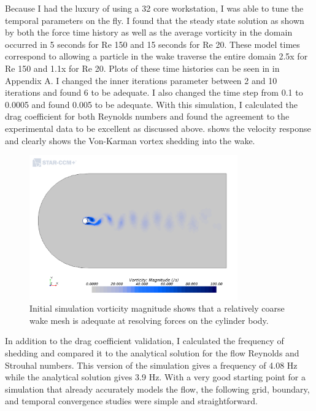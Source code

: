 \documentclass[10pt,english]{article}
\begin{document}
 Because I had the luxury of using a 32 core workstation, I was able to tune the temporal parameters on the fly.  I found that the steady state solution as shown by both the force time history as well as the average vorticity in the domain occurred in 5 seconds for Re 150 and 15 seconds for Re 20.  These model times correspond to allowing a particle in the wake traverse the entire domain 2.5x for Re 150 and 1.1x for Re 20.  Plots of these time histories can be seen in  in Appendix A.  I changed the inner iterations parameter between 2 and 10 iterations and found 6 to be adequate.  I also changed the time step from 0.1 to 0.0005 and found 0.005 to be adequate.  With this simulation, I calculated the drag coefficient for both Reynolds numbers and found the agreement to the experimental data to be excellent as discussed above.   shows the velocity response and clearly shows the Von-Karman vortex shedding into the wake. 
 
 \begin{figure}[h]
\centering
\includegraphics[trim={1.5cm 0cm 1.0cm 3cm},clip,width=0.8\textwidth]{cylinder_2_05_ScalarScene2_Re150.png}
\vspace{-5pt}
\caption{Initial simulation vorticity magnitude shows that a relatively coarse wake mesh is adequate at resolving forces on the cylinder body. }
\label{f:scalar05_1}
\end{figure}

In addition to the drag coefficient validation, I calculated the frequency of shedding and compared it to the analytical solution for the flow Reynolds and Strouhal numbers.  This version of the simulation gives a frequency of 4.08 Hz while the analytical solution gives 3.9 Hz.  With a very good starting point for a simulation that already accurately models the flow, the following grid, boundary, and temporal convergence studies were simple and straightforward.
\end{document}
